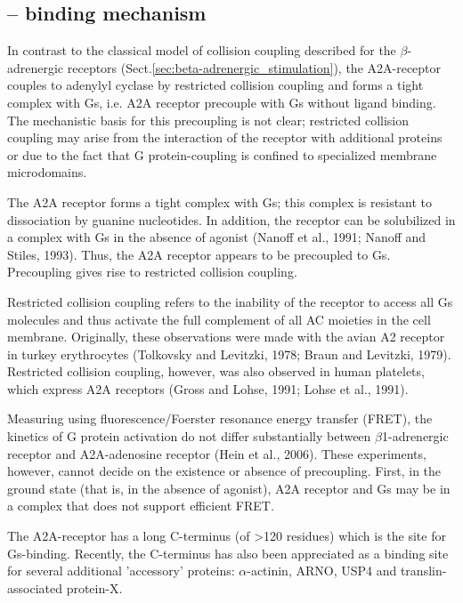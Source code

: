 \subsection{-- binding mechanism}
\label{sec:A2A-receptor-binding}

In contrast to the classical model of collision coupling described for the
$\beta$-adrenergic receptors (Sect.\ref{sec:beta-adrenergic_stimulation}), the
A2A-receptor couples to adenylyl cyclase by restricted collision coupling and
forms a tight complex with Gs, i.e. A2A receptor precouple with Gs without
ligand binding. The mechanistic basis for this precoupling is not clear;
restricted collision coupling may arise from the interaction of the receptor
with additional proteins or due to the fact that G protein-coupling is confined
to specialized membrane microdomains.

\begin{mdframed}

The A2A receptor forms a tight complex with Gs; this complex is resistant to
dissociation by guanine nucleotides. In addition, the receptor can be
solubilized in a complex with Gs in the absence of agonist (Nanoff et al., 1991;
Nanoff and Stiles, 1993). Thus, the A2A receptor appears to be precoupled to Gs.  
Precoupling gives rise to restricted collision coupling.

Restricted collision coupling refers to the inability of the receptor to access
all Gs molecules and thus activate the full complement of all AC moieties in the
cell membrane. Originally, these observations were made with the avian A2
receptor in turkey erythrocytes (Tolkovsky and Levitzki, 1978; Braun and
Levitzki, 1979). Restricted collision coupling, however, was also observed in
human platelets, which express A2A receptors (Gross and Lohse, 1991; Lohse et
al., 1991).

Measuring using fluorescence/Foerster resonance energy transfer (FRET), the
kinetics of G protein activation do not differ substantially between
$\beta$1-adrenergic receptor and A2A-adenosine receptor (Hein et al., 2006). These
experiments, however, cannot decide on the existence or absence of precoupling.
First, in the ground state (that is, in the absence of agonist), A2A receptor
and Gs may be in a complex that does not support efficient FRET.
\end{mdframed}

The A2A-receptor has a long C-terminus (of >120 residues) which is the site for
Gs-binding. Recently, the C-terminus has also been appreciated as a binding site
for several additional 'accessory' proteins: $\alpha$-actinin, ARNO, USP4 and
translin-associated protein-X.

